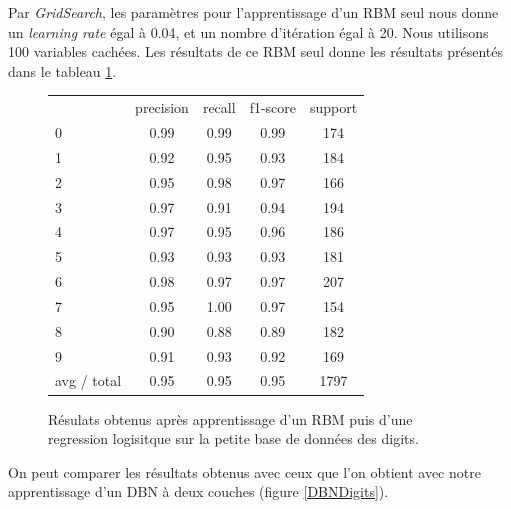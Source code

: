 \documentclass[10pt,a4paper]{article}
\begin{document}
Par \textit{GridSearch}, les paramètres pour l'apprentissage d'un RBM seul nous donne un \emph{learning rate} égal à 0.04, et un nombre d'itération égal à 20. Nous utilisons 100 variables cachées. Les résultats de ce RBM seul donne les résultats présentés dans le tableau \ref{RBMDigits}.
\begin{figure}[ht!]\centering
	\begin{tabular}{l|c|c|c|c}
						 &  precision  &  recall & f1-score  & support \\
						0&       0.99   &   0.99    &  0.99   &    174 \\
						1 &      0.92    &  0.95     & 0.93     &  184 \\
						2  &     0.95    &  0.98      &0.97    &   166 \\
						3   &    0.97    &  0.91     & 0.94   &    194 \\
						4    &   0.97    &  0.95    &  0.96  &     186 \\
						5     &  0.93  &    0.93     & 0.93 &      181 \\
						6      & 0.98    &  0.97    &  0.97&       207 \\
						7       &0.95  &    1.00    &  0.97   &    154 \\
						8       &0.90   &   0.88     & 0.89   &    182 \\
						9 &      0.91    &  0.93    &  0.92     &  169 \\
	avg / total  &     0.95    &  0.95    &  0.95    &  1797 \\
	\end{tabular}
	\label{RBMDigits}
	\caption{Résulats obtenus après apprentissage d'un RBM puis d'une regression logisitque sur la petite base de données des digits.}
\end{figure}


On peut comparer les résultats obtenus avec ceux que l'on obtient avec notre apprentissage d'un DBN à deux couches (figure \ref{DBNDigits}).
\end{document}
